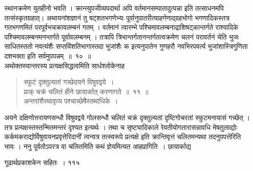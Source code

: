 \documentclass[11pt, openany]{book}
\begin{document}
\begin{sloppypar}
\noindent स्थानक्रमेण युतहीनो भवति । क्रान्त्युपजीव्यपदार्था अपि वर्तमानसम्पातादुत्पन्ना इति तत्साधनमपि तत्संस्कृतग्रहात्। अथायनांशज्ञानं तु षट्शतभगणेभ्यः पूर्वानुपातरीत्याहर्गणाद्ग्रहभोगो भगणादिकस्तत्र गतभगणमितं परपूर्वभचक्रावलम्बनं गतम् । वर्तमानं त्वारम्भे पश्चिमावलम्बनाद्राशिषट्कान्तर्गते  राश्यादिके पश्चिमावलम्बनमनन्तर्गते पूर्वावलम्बनम् । तत्रापि त्रिभान्तर्गतानन्तर्गतत्वक्रमेण चलनं परावर्तनं चेति भुजः साधितस्ततो नवत्यंशैः सप्तविंशतिभागास्तदा भुजांशैः क इत्यनुपातेन गुणहरौ नवभिरपवर्त्य भुजांशास्त्रिगुणिता दशभक्ता इति सर्वमुपपन्नम्~॥~१०~॥\\
\noindent अथोक्तस्यान्तरस्य प्रत्यक्षसिद्धत्वमिति सार्धश्लोकेनाह\textendash
\end{sloppypar}
\begin{quote}

 {\ssi स्फुटं दृक्तुल्यतां गच्छेदयने विषुवद्वये~।\\
प्राक् चक्रं चलितं हीने छायार्कात् करणागते~॥~११~॥\\
 अन्तरांशैरथावृत्य पश्चाच्छेषैस्तथाधिके~।}
\end{quote}
\begin{sloppypar}
 अयने दक्षिणोत्तरायणसन्धौ विषुवद्वये गोलसन्धौ चलितं चक्रं दृक्तुल्यतां दृष्टिगोचरतां स्फुटमनायासं गच्छेत् । तत्र प्रत्यक्षस्तस्तन्मितमन्तरं दृश्यत इत्यर्थः । तथा च सृष्ट्यादिकाले रेवतीयोगतारासन्नावधि मेषतुलाद्योः कर्कमकराद्योर्विषुवायनप्रवृत्तेरिदानीं त्वन्यत्र तत्स्वरूपे प्रत्यक्षे इति क्रान्तिवृत्तं चलितमन्यथा तदनुपपत्तेरिति भावः । ननु पूर्वतोऽपरत्र वा चलितमिति कथं ज्ञेयमित्यत आह\textendash प्रागिति~। छायार्काद्य\textendash
\end{sloppypar}


\newpage


\hspace{3cm} गूढार्थप्रकाशकेन सहितः~। \hfill ११५
\vspace{1cm}
\end{document}
